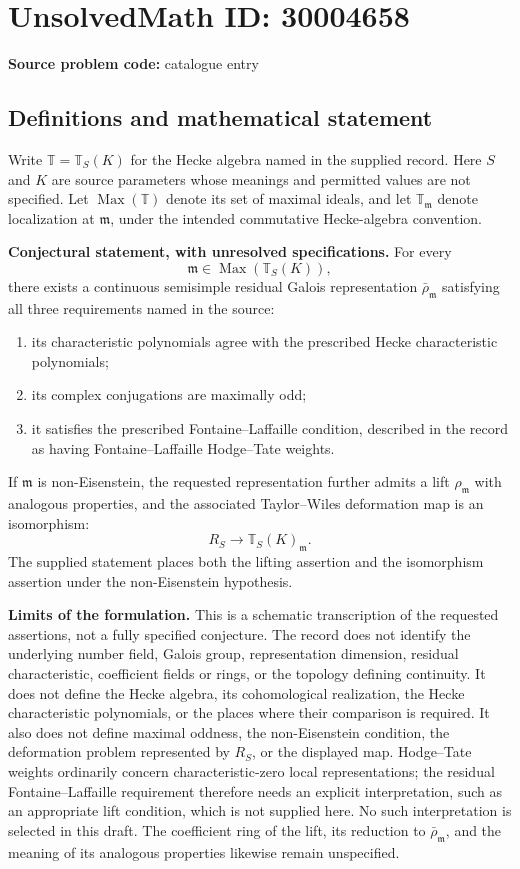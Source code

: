 \documentclass[11pt]{article}
\begin{document}
\section*{UnsolvedMath ID: 30004658}
\textbf{Source problem code:} catalogue entry
\subsection{Definitions and mathematical statement}
Write \(\mathbb T=\mathbb T_S(K)\) for the Hecke algebra named in the supplied record. Here \(S\) and \(K\) are source parameters whose meanings and permitted values are not specified. Let \(\operatorname{Max}(\mathbb T)\) denote its set of maximal ideals, and let \(\mathbb T_{\mathfrak m}\) denote localization at \(\mathfrak m\), under the intended commutative Hecke-algebra convention.

\textbf{Conjectural statement, with unresolved specifications.} For every
\[
\mathfrak m\in\operatorname{Max}(\mathbb T_S(K)),
\]
there exists a continuous semisimple residual Galois representation \(\bar\rho_{\mathfrak m}\) satisfying all three requirements named in the source:
\begin{enumerate}
\item its characteristic polynomials agree with the prescribed Hecke characteristic polynomials;
\item its complex conjugations are maximally odd;
\item it satisfies the prescribed Fontaine--Laffaille condition, described in the record as having Fontaine--Laffaille Hodge--Tate weights.
\end{enumerate}
If \(\mathfrak m\) is non-Eisenstein, the requested representation further admits a lift \(\rho_{\mathfrak m}\) with analogous properties, and the associated Taylor--Wiles deformation map is an isomorphism:
\[
R_S\longrightarrow\mathbb T_S(K)_{\mathfrak m}.
\]
The supplied statement places both the lifting assertion and the isomorphism assertion under the non-Eisenstein hypothesis.

\textbf{Limits of the formulation.} This is a schematic transcription of the requested assertions, not a fully specified conjecture. The record does not identify the underlying number field, Galois group, representation dimension, residual characteristic, coefficient fields or rings, or the topology defining continuity. It does not define the Hecke algebra, its cohomological realization, the Hecke characteristic polynomials, or the places where their comparison is required. It also does not define maximal oddness, the non-Eisenstein condition, the deformation problem represented by \(R_S\), or the displayed map. Hodge--Tate weights ordinarily concern characteristic-zero local representations; the residual Fontaine--Laffaille requirement therefore needs an explicit interpretation, such as an appropriate lift condition, which is not supplied here. No such interpretation is selected in this draft. The coefficient ring of the lift, its reduction to \(\bar\rho_{\mathfrak m}\), and the meaning of its analogous properties likewise remain unspecified.
\end{document}
